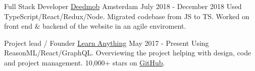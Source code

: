 
\begin{cventries}

  \cventry
    {Full Stack Developer} %
    {\href{https://www.deedmob.com}{Deedmob}} %
    {Amsterdam} %
    {July 2018 - December 2018} %
    {
      {Used TypeScript/React/Redux/Node. Migrated codebase from JS to TS. Worked on front end \& backend of the website in an agile enviroment.}
    }

  \cventry
    {Project lead / Founder} %
    {\href{https://learn-anything.xyz}{Learn Anything}} %
    {} %
    {May 2017 - Present} %
    {
      {Using ReasonML/React/GraphQL. Overviewing the project helping with design, code and project management. 10,000+ stars on \href{https://github.com/learn-anything/learn-anything}{GitHub}.}
    }

\end{cventries}
